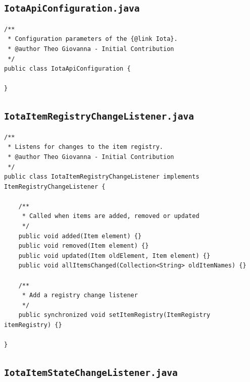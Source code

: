 \documentclass[a4paper,10pt]{article}
\begin{document}
\subsection{\texttt{IotaApiConfiguration.java}}

\begin{verbatim}
/**
 * Configuration parameters of the {@link Iota}.
 * @author Theo Giovanna - Initial Contribution
 */
public class IotaApiConfiguration {

}
\end{verbatim}

\subsection{\texttt{IotaItemRegistryChangeListener.java}}

\begin{verbatim}
/**
 * Listens for changes to the item registry.
 * @author Theo Giovanna - Initial Contribution
 */
public class IotaItemRegistryChangeListener implements ItemRegistryChangeListener {

	/**
	 * Called when items are added, removed or updated
	 */ 
	public void added(Item element) {}
	public void removed(Item element) {}
	public void updated(Item oldElement, Item element) {}
	public void allItemsChanged(Collection<String> oldItemNames) {}

	/**
	 * Add a registry change listener
	 */
	public synchronized void setItemRegistry(ItemRegistry itemRegistry) {}

}
\end{verbatim}

\newpage

\subsection{\texttt{IotaItemStateChangeListener.java}}
\end{document}
